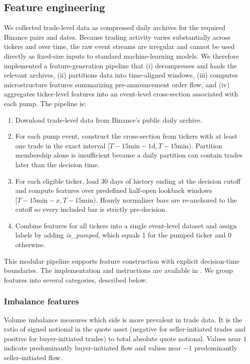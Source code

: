 \documentclass{ieeeaccess}
\begin{document}
\subsection{Feature engineering}

We collected trade-level data as compressed daily archives for the required Binance pairs and dates. Because trading activity varies substantially across tickers and over time, the raw event streams are irregular and cannot be used directly as fixed-size inputs to standard machine-learning models. We therefore implemented a feature-generation pipeline that (i) decompresses and loads the relevant archives, (ii) partitions data into time-aligned windows, (iii) computes microstructure features summarizing pre-announcement order flow, and (iv) aggregates ticker-level features into an event-level cross-section associated with each pump. The pipeline is:

\begin{enumerate}
    \item Download trade-level data from Binance's public daily archive.
    \item For each pump event, construct the cross-section from tickers with at least one trade in the exact interval $[T-15\text{min}-1\text{d},T-15\text{min})$. Partition membership alone is insufficient because a daily partition can contain trades later than the decision time.
    \item For each eligible ticker, load 30 days of history ending at the decision cutoff and compute features over predefined half-open lookback windows $[T-15\text{min}-x,T-15\text{min})$. Hourly normalizer bars are re-anchored to the cutoff so every included bar is strictly pre-decision.
    \item Combine features for all tickers into a single event-level dataset and assign labels by adding \textit{is\_pumped}, which equals 1 for the pumped ticker and 0 otherwise.
\end{enumerate}

This modular pipeline supports feature construction with explicit decision-time boundaries. The implementation and instructions are available in \cite{code_github}. We group features into several categories, described below.

\subsubsection{Imbalance features}

Volume imbalance measures which side is more prevalent in trade data. It is the ratio of signed notional in the quote asset (negative for seller-initiated trades and positive for buyer-initiated trades) to total absolute quote notional. Values near $1$ indicate predominantly buyer-initiated flow and values near $-1$ predominantly seller-initiated flow.
\end{document}

